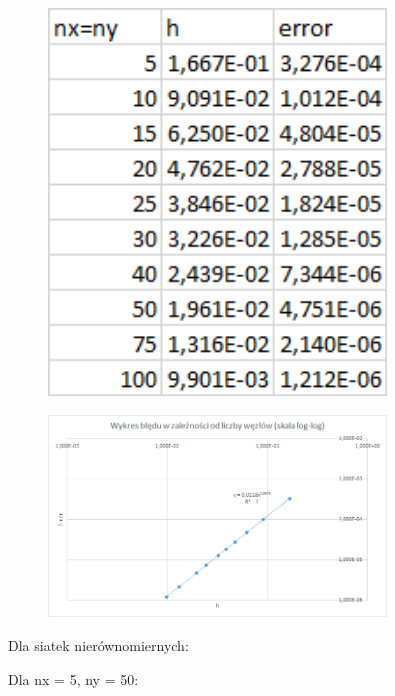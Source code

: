 \begin{figure}[!ht]
	\begin{center}
		\includegraphics[width=0.8\textwidth]{Lab5/charts/zad3/error_dane.png}
	\end{center}
\end{figure}

\begin{figure}[!ht]
	\begin{center}
		\includegraphics[width=0.8\textwidth]{Lab5/charts/zad3/error.png}
	\end{center}
\end{figure}

\newpage

Dla siatek nierównomiernych:

Dla nx = 5, ny = 50:

